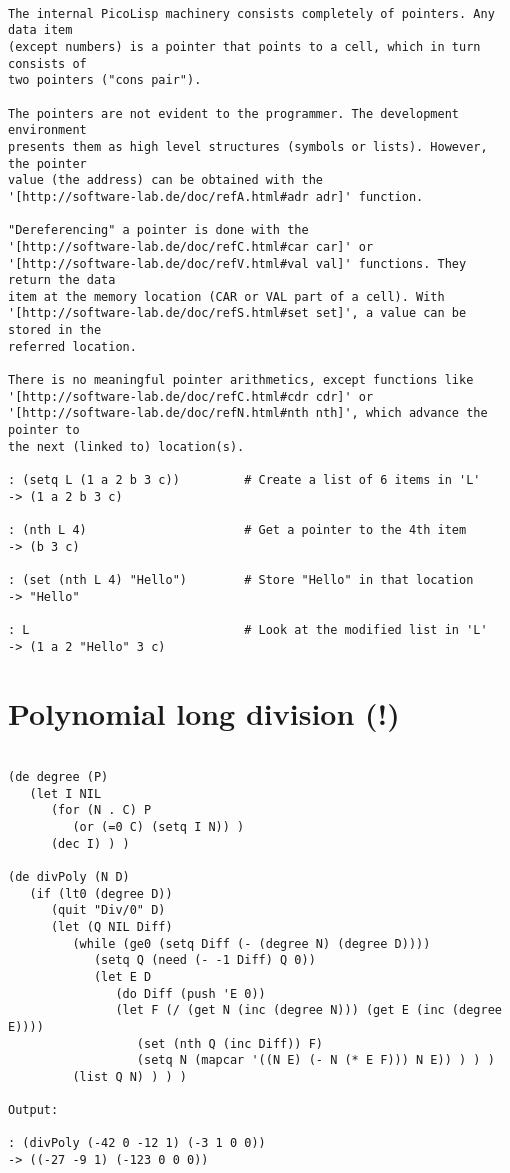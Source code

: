 \begin{verbatim}

The internal PicoLisp machinery consists completely of pointers. Any data item
(except numbers) is a pointer that points to a cell, which in turn consists of
two pointers ("cons pair").

The pointers are not evident to the programmer. The development environment
presents them as high level structures (symbols or lists). However, the pointer
value (the address) can be obtained with the
'[http://software-lab.de/doc/refA.html#adr adr]' function.

"Dereferencing" a pointer is done with the
'[http://software-lab.de/doc/refC.html#car car]' or
'[http://software-lab.de/doc/refV.html#val val]' functions. They return the data
item at the memory location (CAR or VAL part of a cell). With
'[http://software-lab.de/doc/refS.html#set set]', a value can be stored in the
referred location.

There is no meaningful pointer arithmetics, except functions like
'[http://software-lab.de/doc/refC.html#cdr cdr]' or
'[http://software-lab.de/doc/refN.html#nth nth]', which advance the pointer to
the next (linked to) location(s).

: (setq L (1 a 2 b 3 c))         # Create a list of 6 items in 'L'
-> (1 a 2 b 3 c)

: (nth L 4)                      # Get a pointer to the 4th item
-> (b 3 c)

: (set (nth L 4) "Hello")        # Store "Hello" in that location
-> "Hello"

: L                              # Look at the modified list in 'L'
-> (1 a 2 "Hello" 3 c)

\end{verbatim}

\section*{Polynomial long division (!)}

\begin{verbatim}

(de degree (P)
   (let I NIL
      (for (N . C) P
         (or (=0 C) (setq I N)) )
      (dec I) ) )

(de divPoly (N D)
   (if (lt0 (degree D))
      (quit "Div/0" D)
      (let (Q NIL Diff)
         (while (ge0 (setq Diff (- (degree N) (degree D))))
            (setq Q (need (- -1 Diff) Q 0))
            (let E D
               (do Diff (push 'E 0))
               (let F (/ (get N (inc (degree N))) (get E (inc (degree E))))
                  (set (nth Q (inc Diff)) F)
                  (setq N (mapcar '((N E) (- N (* E F))) N E)) ) ) )
         (list Q N) ) ) )

Output:

: (divPoly (-42 0 -12 1) (-3 1 0 0))
-> ((-27 -9 1) (-123 0 0 0))

\end{verbatim}

